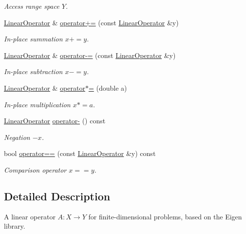 \begin{DoxyCompactItemize}
\begin{DoxyCompactList}\small\item\em Access range space $Y$. \end{DoxyCompactList}\item 
\hyperlink{classSpacy_1_1Rn_1_1LinearOperator}{Linear\-Operator} \& \hyperlink{classSpacy_1_1AddArithmeticOperators_afad1d01e1e8c6f75290ac46d9b047ea8}{operator+=} (const \hyperlink{classSpacy_1_1Rn_1_1LinearOperator}{Linear\-Operator} \&y)
\begin{DoxyCompactList}\small\item\em In-\/place summation $ x+=y$. \end{DoxyCompactList}\item 
\hyperlink{classSpacy_1_1Rn_1_1LinearOperator}{Linear\-Operator} \& \hyperlink{classSpacy_1_1AddArithmeticOperators_a9fa91e177d13203cfe8cfa991c64ca36}{operator-\/=} (const \hyperlink{classSpacy_1_1Rn_1_1LinearOperator}{Linear\-Operator} \&y)
\begin{DoxyCompactList}\small\item\em In-\/place subtraction $ x-=y$. \end{DoxyCompactList}\item 
\hyperlink{classSpacy_1_1Rn_1_1LinearOperator}{Linear\-Operator} \& \hyperlink{classSpacy_1_1AddArithmeticOperators_a1d3db95b24fd2bc1de712c9e04c47e2f}{operator$\ast$=} (double a)
\begin{DoxyCompactList}\small\item\em In-\/place multiplication $ x*=a$. \end{DoxyCompactList}\item 
\hyperlink{classSpacy_1_1Rn_1_1LinearOperator}{Linear\-Operator} \hyperlink{classSpacy_1_1AddArithmeticOperators_a5acd030bf265d130983fd6e3c5b68be5}{operator-\/} () const
\begin{DoxyCompactList}\small\item\em Negation $ -x$. \end{DoxyCompactList}\item 
bool \hyperlink{classSpacy_1_1AddArithmeticOperators_a5ff1909f49f4a705d69663dc2d4b6316}{operator==} (const \hyperlink{classSpacy_1_1Rn_1_1LinearOperator}{Linear\-Operator} \&y) const
\begin{DoxyCompactList}\small\item\em Comparison operator $ x==y$. \end{DoxyCompactList}\end{DoxyCompactItemize}


\subsection{Detailed Description}
A linear operator $A:X\rightarrow Y$ for finite-\/dimensional problems, based on the Eigen library. 

